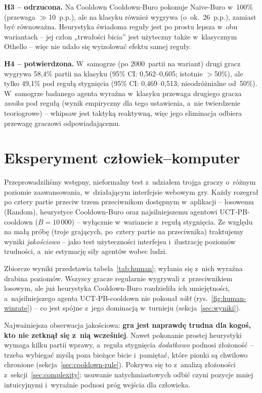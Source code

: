 \documentclass[12pt,a4paper]{article}
\begin{document}
\textbf{H3 -- odrzucona.} Na Cooldown Cooldown-Buro pokonuje Naive-Buro w~100\% (przewaga
$\gg$10~p.p.), ale na klasyku również wygrywa (o~ok.\ 26~p.p.), zamiast być równoważna. Heurystyka
świadoma reguły jest po prostu lepsza w~obu wariantach -- jej człon „trwałości bicia” jest użyteczny
także w~klasycznym Othello -- więc nie udało się wyizolować efektu samej reguły.

\textbf{H4 -- potwierdzona.} W~samogrze (po 2000~partii na wariant) drugi gracz wygrywa 58,4\%
partii na klasyku (95\% CI: 0,562--0,605; istotnie $>$50\%), ale tylko 49,1\% pod regułą stygnięcia
(95\% CI: 0,469--0,513; nieodróżnialne od~50\%). W~samogrze badanego agenta wyraźna w~klasyku
przewaga drugiego gracza \emph{zanika} pod regułą (wynik empiryczny dla tego ustawienia, a~nie
twierdzenie teoriogrowe) -- whipsaw jest taktyką reaktywną, więc jego eliminacja odbiera przewagę
graczowi odpowiadającemu.

\section{Eksperyment człowiek--komputer}\label{sec:human}
Przeprowadziliśmy wstępny, nieformalny test z~udziałem trojga graczy o~różnym poziomie zaawansowania,
w~działającym interfejsie webowym gry. Każdy rozegrał po cztery partie przeciw trzem przeciwnikom
dostępnym w~aplikacji -- losowemu (Random), heurystyce Cooldown-Buro oraz najsilniejszemu agentowi
UCT-PB-cooldown ($B=10\,000$) -- wyłącznie w~wariancie z~regułą stygnięcia. Ze względu na małą próbę
(troje grających, po~cztery partie na przeciwnika) traktujemy wyniki \emph{jakościowo} -- jako test
użyteczności interfejsu i~ilustrację poziomów trudności, a~nie estymację siły agentów wobec ludzi.

Zbiorcze wyniki przedstawia tabela~\ref{tab:human}; wyłania się z~nich wyraźna drabina poziomów.
Wszyscy gracze regularnie wygrywali z~przeciwnikiem losowym, ale już heurystyka Cooldown-Buro
rozdzieliła ich umiejętności, a~najsilniejszego agenta UCT-PB-cooldown nie pokonał \emph{nikt}
(rys.~\ref{fig:human-winrate}) -- co jest spójne z~jego dominacją w~turnieju
(sekcja~\ref{sec:wyniki}).



Najważniejsza obserwacja jakościowa: \textbf{gra jest naprawdę trudna dla kogoś, kto nie zetknął się
z~nią wcześniej}. Nawet pokonanie prostej heurystyki wymaga kilku partii wprawy, a~reguła stygnięcia
\emph{dodatkowo} podnosi złożoność -- trzeba wybiegać myślą poza bieżące bicie i~pamiętać, które
pionki są chwilowo chronione (sekcja~\ref{sec:cooldown-rule}). Pokrywa się to z~analizą złożoności
z~sekcji~\ref{sec:complexity}: usuwanie natychmiastowych odbić czyni pozycje mniej intuicyjnymi
i~wyraźnie podnosi próg wejścia dla człowieka.
\end{document}
